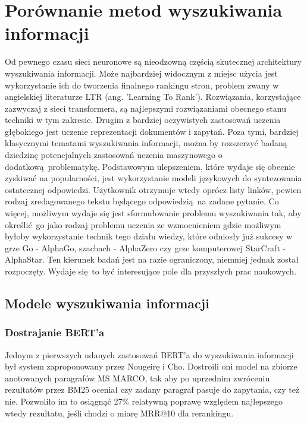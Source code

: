 \chapter{Porównanie metod wyszukiwania informacji}
\label{chap:trzeci}

Od pewnego czasu sieci neuronowe są nieodzowną częścią skutecznej architektury wyszukiwania informacji. Może najbardziej widocznym z miejsc użycia jest wykorzystanie ich do tworzenia finalnego rankingu stron, problem zwany w angielskiej literaturze LTR (ang. 'Learning To Rank'). Rozwiązania, korzystające zazwyczaj z sieci transformera, są najlepszymi rozwiązaniami obecnego stanu techniki w tym zakresie. Drugim z bardziej oczywistych zastosowań uczenia głębokiego jest uczenie reprezentacji dokumentów i zapytań. \autocite{tonellotto2022lecture}  Poza tymi, bardziej klasycznymi tematami wyszukiwania informacji, można by rozszerzyć badaną dziedzinę potencjalnych zastosowań uczenia maszynowego o dodatkową problematykę. Podstawowym ulepszeniem, które wydaje się obecnie zyskiwać na popularności, jest wykorzystanie modeli językowych do syntezowania ostatecznej odpowiedzi. Użytkownik otrzymuje wtedy oprócz listy linków, pewien rodzaj zredagowanego tekstu będącego odpowiedzią na zadane pytanie. Co więcej, możliwym wydaje się jest sformułowanie problemu wyszukiwania tak, aby określić go jako rodzaj problemu uczenia ze wzmocnieniem gdzie możliwym byłoby wykorzystanie technik tego działu wiedzy, które odniosły już sukcesy w grze Go - AlphaGo, szachach - AlphaZero czy grze komputerowej StarCraft - AlphaStar. Ten kierunek badań jest na razie ograniczony, niemniej jednak został rozpoczęty. Wydaje się to być interesujące pole dla przyszłych prac naukowych. 

\section{Modele wyszukiwania informacji}

\subsection{Dostrajanie BERT'a}

Jednym z pierwszych udanych zastosowań BERT'a do wyszukiwania informacji był system zaproponowany przez Nougeirę i Cho. Dostroili oni model na zbiorze anotowanych paragrafów MS MARCO, tak aby po uprzednim zwróceniu rezultatów przez BM25 oceniał czy zadany paragraf pasuje do zapytania, czy też nie. Pozwoliło im to osiągnąć 27\% relatywną poprawę względem najlepszego wtedy rezultatu, jeśli chodzi o miarę MRR@10 dla rerankingu\autocite{nogueira2019passage}.

